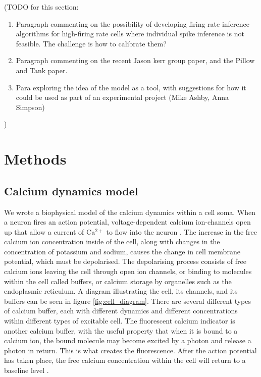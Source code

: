 \documentclass[a4paper,12pt]{article}
\theoremstyle{definition}
\begin{document}
(TODO for this section:
\begin{enumerate}
    \item Paragraph commenting on the possibility of developing firing rate inference algorithms for high-firing rate cells where individual spike inference is not feasible. The challenge is how to calibrate them?
    \item Paragraph commenting on the recent Jason kerr group paper, and the Pillow and Tank paper.
    \item Para exploring the idea of the model as a tool, with suggestions for how it could be used as part of an experimental project (Mike Ashby, Anna Simpson)
\end{enumerate})

\section{Methods}
\subsection{Calcium dynamics model}
We wrote a biophysical model of the calcium dynamics within a cell soma. When a neuron fires an action potential, voltage-dependent calcium ion-channels open up that allow a current of Ca$^{2+}$ to flow into the neuron \cite{koch}. The increase in the free calcium ion concentration inside of the cell, along with changes in the concentration of potassium and sodium, causes the change in cell membrane potential, which must be depolarised. The depolarising process consists of free calcium ions leaving the cell through open ion channels, or binding to molecules within the cell called buffers, or calcium storage by organelles such as the endoplasmic reticulum. A diagram illustrating the cell, its channels, and its buffers can be seen in figure \ref{fig:cell_diagram}. There are several different types of calcium buffer, each with different dynamics and different concentrations within different types of excitable cell. The fluorescent calcium indicator is another calcium buffer, with the useful property that when it is bound to a calcium ion, the bound molecule may become excited by a photon and release a photon in return. This is what creates the fluorescence. After the action potential has taken place, the free calcium concentration within the cell will return to a baseline level \cite{maravall}. 
\end{document}
